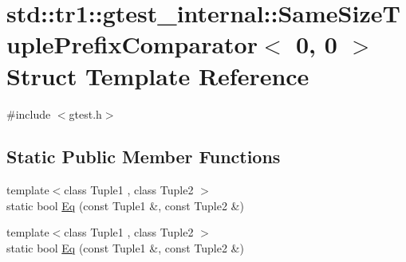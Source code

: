 \hypertarget{structstd_1_1tr1_1_1gtest__internal_1_1_same_size_tuple_prefix_comparator_3_010_00_010_01_4}{\section{std\-:\-:tr1\-:\-:gtest\-\_\-internal\-:\-:Same\-Size\-Tuple\-Prefix\-Comparator$<$ 0, 0 $>$ Struct Template Reference}
\label{structstd_1_1tr1_1_1gtest__internal_1_1_same_size_tuple_prefix_comparator_3_010_00_010_01_4}
}


{\ttfamily \#include $<$gtest.\-h$>$}

\subsection*{Static Public Member Functions}
\begin{DoxyCompactItemize}
\item 
{\footnotesize template$<$class Tuple1 , class Tuple2 $>$ }\\static bool \hyperlink{structstd_1_1tr1_1_1gtest__internal_1_1_same_size_tuple_prefix_comparator_3_010_00_010_01_4_a4f209822266c6bb1832c49750a11ef95}{Eq} (const Tuple1 \&, const Tuple2 \&)
\item 
{\footnotesize template$<$class Tuple1 , class Tuple2 $>$ }\\static bool \hyperlink{structstd_1_1tr1_1_1gtest__internal_1_1_same_size_tuple_prefix_comparator_3_010_00_010_01_4_a4f209822266c6bb1832c49750a11ef95}{Eq} (const Tuple1 \&, const Tuple2 \&)
\end{DoxyCompactItemize}


